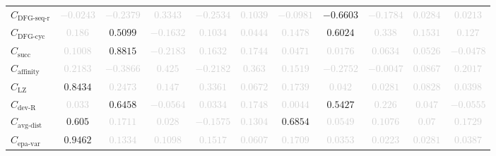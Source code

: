\documentclass{standalone}
\newcommand{\dfgseqrationame}{\text{DFG-seq-r}}
\newcommand{\dfgseqratio}{C_{\dfgseqrationame}}
\newcommand{\dfgcycname}{\text{DFG-cyc}}
\newcommand{\dfgcyc}{C_{\dfgcycname}}
\newcommand{\numberofneighborhoodsname}{\text{succ}}
\newcommand{\numberofneighborhoods}{C_{\numberofneighborhoodsname}}
\newcommand{\lempelzivname}{\text{LZ}}
\newcommand{\lempelziv}{C_{\lempelzivname}}
\newcommand{\affinityname}{\text{affinity}}
\newcommand{\affinity}{C_{\affinityname}}
\newcommand{\deviationfromrandomname}{\text{dev-R}}
\newcommand{\deviationfromrandom}{C_{\deviationfromrandomname}}
\newcommand{\avgdistname}{\text{avg-dist}}
\newcommand{\avgdist}{C_{\avgdistname}}
\newcommand{\epavariantname}{\text{epa-var}}
\newcommand{\epavariant}{C_{\epavariantname}}
\begin{document}
\begin{tabular}{lcccccccccc}
$\dfgseqratio$ & \textcolor{lightgray}{$-0.0243$} & \textcolor{lightgray}{$-0.2379$} & \textcolor{lightgray}{$0.3343$} & \textcolor{lightgray}{$-0.2534$} & \textcolor{lightgray}{$0.1039$} & \textcolor{lightgray}{$-0.0981$} & $-0.6603$ & \textcolor{lightgray}{$-0.1784$} & \textcolor{lightgray}{$0.0284$} & \textcolor{lightgray}{$0.0213$} \\ 
$\dfgcyc$ & \textcolor{lightgray}{$0.186$} & $0.5099$ & \textcolor{lightgray}{$-0.1632$} & \textcolor{lightgray}{$0.1034$} & \textcolor{lightgray}{$0.0444$} & \textcolor{lightgray}{$0.1478$} & $0.6024$ & \textcolor{lightgray}{$0.338$} & \textcolor{lightgray}{$0.1531$} & \textcolor{lightgray}{$0.127$} \\ 
$\numberofneighborhoods$ & \textcolor{lightgray}{$0.1008$} & $0.8815$ & \textcolor{lightgray}{$-0.2183$} & \textcolor{lightgray}{$0.1632$} & \textcolor{lightgray}{$0.1744$} & \textcolor{lightgray}{$0.0471$} & \textcolor{lightgray}{$0.0176$} & \textcolor{lightgray}{$0.0634$} & \textcolor{lightgray}{$0.0526$} & \textcolor{lightgray}{$-0.0478$} \\ 
$\affinity$ & \textcolor{lightgray}{$0.2183$} & \textcolor{lightgray}{$-0.3866$} & \textcolor{lightgray}{$0.425$} & \textcolor{lightgray}{$-0.2182$} & \textcolor{lightgray}{$0.363$} & \textcolor{lightgray}{$0.1519$} & \textcolor{lightgray}{$-0.2752$} & \textcolor{lightgray}{$-0.0047$} & \textcolor{lightgray}{$0.0867$} & \textcolor{lightgray}{$0.2017$} \\ 
$\lempelziv$ & $0.8434$ & \textcolor{lightgray}{$0.2473$} & \textcolor{lightgray}{$0.147$} & \textcolor{lightgray}{$0.3361$} & \textcolor{lightgray}{$0.0672$} & \textcolor{lightgray}{$0.1739$} & \textcolor{lightgray}{$0.042$} & \textcolor{lightgray}{$0.0281$} & \textcolor{lightgray}{$0.0828$} & \textcolor{lightgray}{$0.0398$} \\ 
$\deviationfromrandom$ & \textcolor{lightgray}{$0.033$} & $0.6458$ & \textcolor{lightgray}{$-0.0564$} & \textcolor{lightgray}{$0.0334$} & \textcolor{lightgray}{$0.1748$} & \textcolor{lightgray}{$0.0044$} & $0.5427$ & \textcolor{lightgray}{$0.226$} & \textcolor{lightgray}{$0.047$} & \textcolor{lightgray}{$-0.0555$} \\ 
$\avgdist$ & $0.605$ & \textcolor{lightgray}{$0.1711$} & \textcolor{lightgray}{$0.028$} & \textcolor{lightgray}{$-0.1575$} & \textcolor{lightgray}{$0.1304$} & $0.6854$ & \textcolor{lightgray}{$0.0549$} & \textcolor{lightgray}{$0.1076$} & \textcolor{lightgray}{$0.07$} & \textcolor{lightgray}{$0.1729$} \\ 
$\epavariant$ & $0.9462$ & \textcolor{lightgray}{$0.1334$} & \textcolor{lightgray}{$0.1098$} & \textcolor{lightgray}{$0.1517$} & \textcolor{lightgray}{$0.0607$} & \textcolor{lightgray}{$0.1709$} & \textcolor{lightgray}{$0.0353$} & \textcolor{lightgray}{$0.0223$} & \textcolor{lightgray}{$0.0281$} & \textcolor{lightgray}{$0.0387$} \\ 

\end{tabular}
\end{document}
